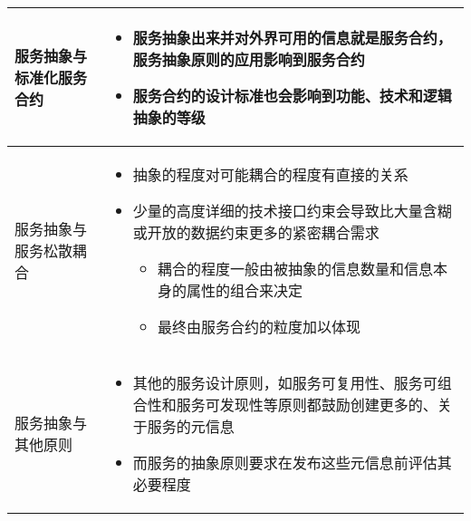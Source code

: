 \begin{longtable}{|m{3cm}<{\centering}|m{12cm}|}
    \hline
    服务抽象与标准化服务合约
    & 
    \vspace{-1.3em}
    \begin{itemize}[leftmargin=1.5em,itemsep=-3pt,topsep=-3pt]
        \item 服务抽象出来并对外界可用的信息就是服务合约，服务抽象原则的应用影响到服务合约
        \item 服务合约的设计标准也会影响到功能、技术和逻辑抽象的等级 
    \vspace{-1.5em}
    \end{itemize}  
    \\ \hline
    服务抽象与服务松散耦合
    & 
    \vspace{-1.3em}
    \begin{itemize}[leftmargin=1.5em,itemsep=-3pt,topsep=-3pt]
        \item 抽象的程度对可能耦合的程度有直接的关系
        \item 少量的高度详细的技术接口约束会导致比大量含糊或开放的数据约束更多的紧密耦合需求
        \begin{itemize}[leftmargin=1.5em,itemsep=-3pt,topsep=-3pt]
            \item 耦合的程度一般由被抽象的信息数量和信息本身的属性的组合来决定
            \item 最终由服务合约的粒度加以体现 
        \end{itemize}
    \vspace{-1.2em}
    \end{itemize}  
    \\ \hline
    服务抽象与其他原则
    & 
    \vspace{-1.3em}
    \begin{itemize}[leftmargin=1.5em,itemsep=-3pt,topsep=-3pt]
        \item 其他的服务设计原则，如服务可复用性、服务可组合性和服务可发现性等原则都鼓励创建更多的、关于服务的元信息
        \item 而服务的抽象原则要求在发布这些元信息前评估其必要程度
    \vspace{-1.5em}
    \end{itemize}  
    \\ \hline
\end{longtable}